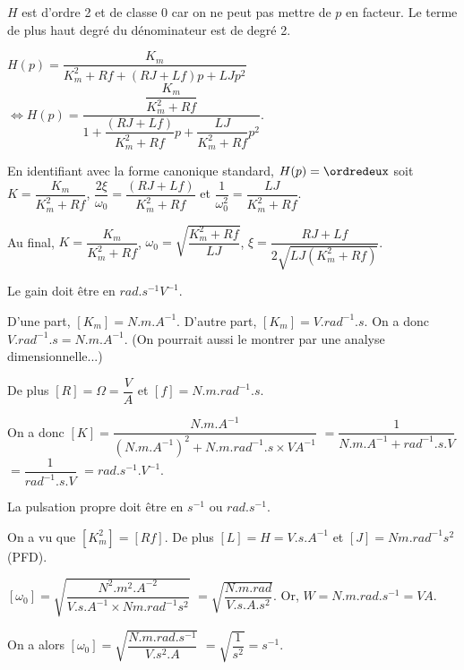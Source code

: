 \ifprof
$H$ est d'ordre 2 et de classe 0 car on ne peut pas mettre de $p$ en facteur. Le terme de plus haut degré du dénominateur est de degré 2. 
\else
\fi

\ifprof
$H(p)=\dfrac{K_m}{K_m^2+ Rf +\left(RJ  + Lf\right) p + LJp^2 } $
$\Leftrightarrow H(p)=\dfrac{\dfrac{K_m}{K_m^2+ Rf}}{1 +\dfrac{\left(RJ  + Lf\right)}{K_m^2+ Rf} p + \dfrac{LJ}{K_m^2+ Rf}p^2 } $. 

\else
\fi




\ifprof
En identifiant avec la forme canonique standard, $H(p)=\ordredeux$ soit
$K = \dfrac{K_m}{K_m^2+ Rf}$, $\dfrac{2\xi}{\omega_0} = \dfrac{\left(RJ  + Lf\right)}{K_m^2+ Rf}$ et $\dfrac{1}{\omega_0^2}=\dfrac{LJ}{K_m^2+ Rf}$.


Au final,
$K = \dfrac{K_m}{K_m^2+ Rf}$,
$\omega_0=\sqrt{\dfrac{K_m^2+ Rf}{LJ}}$,
$\xi = \dfrac{RJ  + Lf}{2\sqrt{{LJ\left(K_m^2+ Rf\right)}}}$.
\else
\fi

\ifprof

Le gain doit être en $\si{rad.s^{-1}V^{-1}}$.

D'une part, $[K_m]=\si{N.m.A^{-1}}$. D'autre part, $[K_m]=\si{V.rad^{-1}.s}$. On a donc $\si{V.rad^{-1}.s}=\si{N.m.A^{-1}}$. (On pourrait aussi le montrer par une analyse dimensionnelle...)

De plus $[R]=\Omega = \dfrac{\si{V}}{\si{A}}$ et $[f]=\si{N.m.rad^{-1}.s}$.

On a donc 
$[K]=\dfrac{\si{N.m.A^{-1}}}
{(\si{N.m.A^{-1}})^2+\si{N.m.rad^{-1}.s}\times\si{VA^{-1}} }$
$=\dfrac{1}
{\si{N.m.A^{-1}}+\si{rad^{-1}.s.V} }$
$=\dfrac{1} {\si{rad^{-1}.s.V} }$
$= {\si{rad.s^{-1}.V^{-1}} }$. 

\vspace{.5cm}

La pulsation propre doit être en $\si{s^{-1}}$ ou $\si{rad.s^{-1}}$.

On a vu que $[K_m^2] = [Rf]$. De plus $[L] = H =  \si{V.s.A^{-1}}$ et 
$[J]=\si{Nm.rad^{-1}s^2}$ (PFD).

$[\omega_0]=\sqrt{
\dfrac{\si{N^2.m^2.A^{-2}}}
{\si{V.s.A^{-1}} \times \si{Nm.rad^{-1}s^2}}
}$
$=\sqrt{
\dfrac{\si{N.m.rad}}{\si{V.s.A.s^2}}
}$. 
Or, $\si{W}=\si{N.m.rad.s^{-1}}=\si{VA}$.

On a alors 
$[\omega_0]=\sqrt{
\dfrac{\si{N.m.rad.s^{-1}}}{\si{V.s^2.A}}
}$
$=\sqrt{
\dfrac{1}{\si{s^2}}
}=\si{s^{-1}}$.


